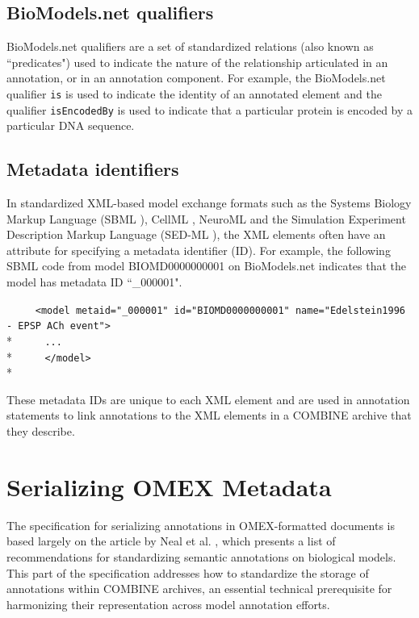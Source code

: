 \documentclass[pdftex,rgb,dvipsnames,svgnames,hyperref,table]{report}
\begin{document}
\subsection{BioModels.net qualifiers}
BioModels.net qualifiers are a set of standardized relations (also known as ``predicates") used to indicate the nature of the relationship articulated in an annotation, or in an annotation component. For example, the BioModels.net qualifier \texttt{is} is used to indicate the identity of an annotated element and the qualifier \texttt{isEncodedBy} is used to indicate that a particular protein is encoded by a particular DNA sequence.

\subsection{Metadata identifiers}
In standardized XML-based model exchange formats such as the Systems Biology Markup Language (SBML \cite{SBML2003}), CellML \cite{CellML2003}, NeuroML \cite{NeuroML} and the Simulation Experiment Description Markup Language (SED-ML \cite{SEDML}), the XML elements often have an attribute for specifying a metadata identifier (ID). For example, the following SBML code from model BIOMD0000000001 on BioModels.net indicates that the model has metadata ID ``\_000001".

\verb|     <model metaid="_000001" id="BIOMD0000000001" name="Edelstein1996 - EPSP ACh event">|\\*
\verb|     ...|\\*
\verb|     </model>|\\*

These metadata IDs are unique to each XML element and are used in annotation statements to link annotations to the XML elements in a COMBINE archive that they describe.
  
\section{Serializing OMEX Metadata}
The specification for serializing annotations in OMEX-formatted documents is based largely on the article by Neal et al. \cite{Neal2019}, which presents a list of recommendations for standardizing semantic annotations on biological models. This part of the specification addresses how to standardize the storage of annotations within COMBINE archives, an essential technical prerequisite for harmonizing their representation across model annotation efforts.
\end{document}
